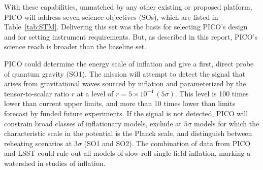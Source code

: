 \documentclass[PICOReport.tex]{subfiles}
\begin{document}

With these capabilities, unmatched by any other existing or proposed platform, PICO will address seven science objectives (SOs), which are listed in Table~\ref{tab:STM}. Delivering this set was the basis for selecting PICO's design and for setting instrument requirements. But, as described in this report, PICO's science reach is broader than the baseline set. 


PICO could determine the energy scale of inflation and give a first, direct probe of quantum gravity (SO1). %
The mission will attempt to detect the signal that arises from gravitational waves sourced by inflation and parameterized by the tensor-to-scalar ratio $r$ at a level of $r =5\times10^{-4} \, (5\sigma)$. This level is 100 times lower than current upper limits, and more than 10 times lower than limits forecast by funded future experiments.  If the signal is not detected, PICO will constrain broad classes of inflationary models, exclude at $5 \sigma$ models for which the characteristic scale in the potential is the Planck scale, and distinguish between reheating scenarios at $3\sigma$ (SO1 and SO2). The combination of data from PICO and LSST could rule out all models of slow-roll single-field inflation, marking a watershed in studies of inflation. 
\end{document}
